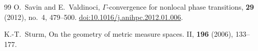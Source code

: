 \documentclass[reqno,11pt]{amsart}
\numberwithin{equation}{section}
\theoremstyle{definition} %
\theoremstyle{plain}
\theoremstyle{definition}
\theoremstyle{remark}
\begin{document}
\begin{thebibliography}{99}
O.~Savin and E.~Valdinoci,
\newblock $\Gamma$-convergence for nonlocal phase transitions,
 \textbf{29} (2012), no.~4, 479--500.
\newblock \href{https://doi.org/10.1016/j.anihpc.2012.01.006}{doi:10.1016/j.anihpc.2012.01.006}.

K.-T.~Sturm,
\newblock On the geometry of metric measure spaces. {II},
 \textbf{196} (2006), 133--177.

\end{thebibliography}
\end{document}

